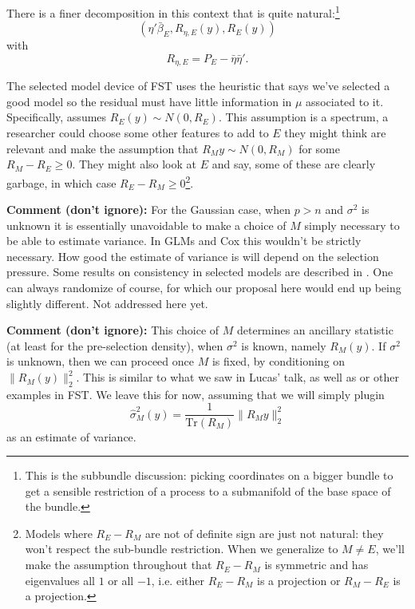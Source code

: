 \documentclass{article}
\newcommand{\OLS}{\bar{\beta}}
\begin{document}
        There is a finer decomposition in this context that is quite natural:\footnote{This is the
        subbundle discussion: picking coordinates on a bigger bundle
        to get a sensible restriction of a process to a submanifold of
        the base space of the bundle.}
        $$ (\eta'\OLS_E, R_{\eta,E}(y), R_E(y)) 
        $$ with
        $$ R_{\eta,E} = P_E - \bar{\eta}\bar{\eta}'.
        $$

        The selected model device of FST uses the heuristic that says
        we've selected a good model so the residual must have little
        information in $\mu$ associated to it.  Specifically, assumes
        $R_E(y) \sim N(0, R_E)$. This assumption is a spectrum, a
        researcher could choose some other features to add to $E$ they
        might think are relevant and make the assumption that $R_{M}y
        \sim N(0, R_M)$ for some $R_{M}-R_E \geq 0$. They might also
        look at $E$ and say, some of these are clearly garbage, in
        which case $R_E-R_M \geq 0$\footnote{Models where $R_E-R_M$ are not
        of definite sign are just not natural: they won't respect the
        sub-bundle restriction. When we generalize to $M \neq E$, we'll make the
        assumption throughout that $R_E-R_M$ is symmetric and has eigenvalues all
        $1$ or all $-1$, i.e. either $R_E-R_M$ is a projection or $R_M-R_E$ is a projection.}.

        {\bf Comment (don't ignore):} For the Gaussian case, when $p >
        n$ and $\sigma^2$ is unknown it is essentially unavoidable to
        make a choice of $M$ simply necessary to be able to estimate
        variance. In GLMs and Cox this wouldn't be strictly necessary. How good
        the estimate of variance is will depend on the selection pressure. Some
        results on consistency in selected models are described in \cite{xiaoying:randomized}.
        One can always randomize of course, for which our proposal here would
        end up being slightly different. Not addressed here yet.

        {\bf Comment (don't ignore):} This choice of $M$ determines an
        ancillary statistic (at least for the pre-selection density),
        when $\sigma^2$ is known, namely $R_M(y)$. If $\sigma^2$ is
        unknown, then we can proceed once $M$ is fixed, by
        conditioning on $\|R_{M}(y)\|^2_2$. This is similar to what we
        saw in Lucas' talk, as well as \cite{sqrtlasso} or other
        examples in FST.  We leave this for now, assuming that we will
        simply plugin
        $$ \hat{\sigma}^2_{M}(y) = \frac{1}{\text{Tr}(R_{M})}
        \|R_{M}y\|^2_2
        $$ as an estimate of variance.
\end{document}
